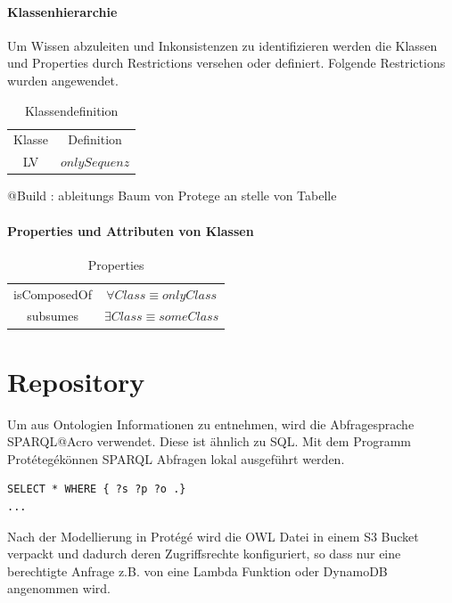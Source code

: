 \documentclass[
12pt,
english,
ngerman,
headsepline,
twoside,
openright,
numbers=noenddot,version=first
]{scrreprt}
\providecommand{\tabularnewline}{\\}
\begin{document}
\paragraph{Klassenhierarchie}
Um Wissen abzuleiten und Inkonsistenzen zu identifizieren werden die Klassen und Properties durch Restrictions versehen oder definiert. Folgende Restrictions wurden angewendet.
\begin{table}[H]
\caption{Klassendefinition}

\noindent \centering{}\begin{tabular}{cc}
\hline
\noalign{\vskip\doublerulesep}
Klasse & Definition \tabularnewline[\doublerulesep]
\noalign{\vskip\doublerulesep}
LV & $only Sequenz$ \tabularnewline[\doublerulesep]
\end{tabular}
\end{table}

@Build : ableitungs Baum von Protege an stelle von Tabelle

\paragraph{Properties und Attributen von Klassen}

\begin{table}[H]
\caption{Properties}

\noindent \centering{}\begin{tabular}{cc}
\hline
\noalign{\vskip\doublerulesep}
isComposedOf & $\forall{Class} \equiv only Class$ \tabularnewline[\doublerulesep]
\noalign{\vskip\doublerulesep}
subsumes & $\exists{Class} \equiv some Class$ \tabularnewline[\doublerulesep]
\end{tabular}
\end{table}


\section{Repository}

Um aus Ontologien Informationen zu entnehmen, wird die Abfragesprache \glqq SPARQL\grqq @Acro verwendet. 
Diese ist ähnlich zu SQL. Mit dem Programm \glqq Protétegé\grqq können SPARQL Abfragen lokal ausgeführt werden.

\begin{lstlisting}[language=Sparql]
SELECT * WHERE { ?s ?p ?o .}
...
\end{lstlisting}

Nach der Modellierung in Protégé wird die OWL Datei in einem S3 Bucket verpackt und dadurch deren Zugriffsrechte konfiguriert, so dass nur eine berechtigte Anfrage z.B. von eine Lambda Funktion oder DynamoDB angenommen wird.
\end{document}
